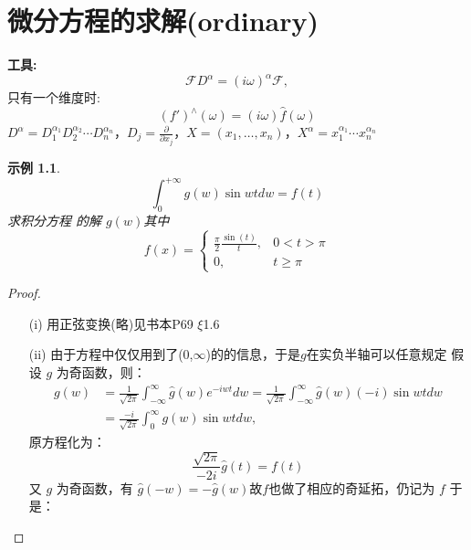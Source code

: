 \documentclass[linespread=1.5,openany]{book}%
\theoremstyle{plain}
\newtheorem{example}[theorem]{示例}
\begin{document}
{{				\chapter{微分方程的求解(ordinary)}
				{\textbf{工具:}
					\begin{equation}
						\mathcal{F} D^\alpha = (i \omega)^\alpha \mathcal{F}, 
					\end{equation}
					只有一个维度时:
					\[	(f')^\wedge(\omega) = (i \omega) \hat{f}(\omega) \]
					\(D^\alpha = D_1^{\alpha_1} D_2^{\alpha_2} \cdots D_n^{\alpha_n}\)，\(D_j = \frac{\partial}{\partial x_j}\)，\(X = (x_1, \ldots, x_n)\)，\(X^\alpha = x_1^{\alpha_1} \cdots x_n^{\alpha_n}\)
					\begin{example}
						\begin{equation}
							\int_0^{+\infty} g(w) \sin wt dw = f(t)
						\end{equation}
						求积分方程 的解 \(g(w)\)其中
						\begin{equation}
							f(x) = 
							\begin{cases} 
								\frac{\pi}{2} \frac{\sin(t)}{t}, & 0<t > \pi \\[8pt]
								0, & t \geq \pi
							\end{cases}
						\end{equation}
					\end{example}
					\begin{proof}
						\begin{itemize}
							\item[(i)]
							用正弦变换(略)见书本P69 $\xi$1.6
							\item[(ii)]由于方程中仅仅用到了(0,$\infty$)的的信息，于是$g$在实负半轴可以任意规定
							假设 \(g\) 为奇函数，则：
							\begin{equation}
								\begin{aligned}
									g(w) &= \frac{1}{\sqrt{2 \pi}} \int_{-\infty}^{\infty} \hat{g}(w) e^{-i w t} dw = \frac{1}{\sqrt{2 \pi}} \int_{-\infty}^{\infty} \hat{g}(w) (-i) \sin w t dw \\[8pt]
									&= \frac{-i}{\sqrt{2 \pi}} \int_0^{\infty} g(w) \sin w t dw,
								\end{aligned}
							\end{equation}
							原方程化为：
							\begin{equation}
								\frac{\sqrt{2 \pi}}{-2 i} \hat{g}(t) = f(t)
							\end{equation}
							又 \(g\) 为奇函数，有 \(\hat{g}(-w) = -\hat{g}(w)\)故$f$也做了相应的奇延拓，仍记为 \(f\)
							于是：
							

\end{itemize}
\end{proof}}}}
\end{document}

